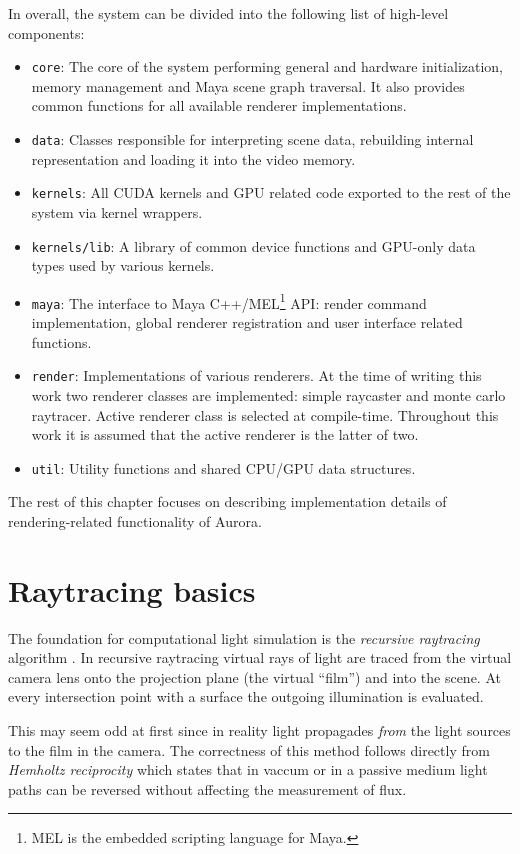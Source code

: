 In overall, the system can be divided into the following list of high-level components:
\begin{itemize}
\item \texttt{core}: The core of the system performing general and hardware initialization, memory management and Maya scene graph traversal. It also provides common functions for all available renderer implementations.
\item \texttt{data}: Classes responsible for interpreting scene data, rebuilding internal representation and loading it into the video memory.
\item \texttt{kernels}: All CUDA kernels and GPU related code exported to the rest of the system via kernel wrappers.
\item \texttt{kernels/lib}: A library of common device functions and GPU-only data types used by various kernels.
\item \texttt{maya}: The interface to Maya C++/MEL\footnote{MEL is the embedded scripting language for Maya.} API: render command implementation, global renderer registration and user interface related functions.
\item \texttt{render}: Implementations of various renderers. At the time of writing this work two renderer classes are implemented: simple raycaster and monte carlo raytracer. Active renderer class is selected at compile-time. Throughout this work it is assumed that the active renderer is the latter of two.
\item \texttt{util}: Utility functions and shared CPU/GPU data structures.
\end{itemize}

The rest of this chapter focuses on describing implementation details of rendering-related functionality of Aurora. \vfill

\section{Raytracing basics}
The foundation for computational light simulation is the \emph{recursive raytracing} algorithm \parencite{whitted79}. In recursive raytracing virtual rays of light are traced from the virtual camera lens onto the projection plane (the virtual ``film'') and into the scene. At every intersection point with a surface the outgoing illumination is evaluated.

This may seem odd at first since in reality light propagades \emph{from} the light sources to the film in the camera. The correctness of this method follows directly from \emph{Hemholtz reciprocity} \parencite{hapke93} which states that in vaccum or in a passive medium light paths can be reversed without affecting the measurement of flux.

